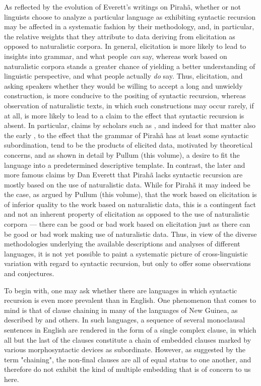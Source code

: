 \documentclass[output=paper,colorlinks,citecolor=brown
]{langscibook}
\begin{document}
As reflected by the evolution of Everett's writings on Pirahã, whether or not linguists choose to analyze a particular language as exhibiting syntactic recursion may be affected in a systematic fashion by their methodology, and, in particular, the relative weights that they attribute to data deriving from elicitation as opposed to naturalistic corpora.  In general, elicitation is more likely to lead to insights into grammar, and what people \emph{can} say, whereas work based on naturalistic corpora stands a greater chance of yielding a better understanding of linguistic perspective, and what people actually \emph{do} say.  Thus, elicitation, and asking speakers whether they would be willing to accept a long and unwieldy construction, is more conducive to the positing of syntactic recursion, whereas observation of naturalistic texts, in which such constructions may occur rarely, if at all, is more likely to lead to a claim to the effect that syntactic recursion is absent.  In particular, claims by scholars such as \citet{sandalo2018selfembedded}, and indeed for that matter also the early \citet{everett1986piraha}, to the effect that the grammar of Pirahã has at least some syntactic subordination, tend to be the products of elicited data, motivated by theoretical concerns, and as shown in detail by Pullum (this volume), a desire to fit the language into a predetermined descriptive template.  In contrast, the later and more famous claims by Dan Everett that Pirahã lacks syntactic recursion are mostly based on the use of naturalistic data.  While for Pirahã it may indeed be the case, as argued by Pullum (this volume), that the work based on elicitation is of inferior quality to the work based on naturalistic data, this is a contingent fact and not an inherent property of elicitation as opposed to the use of naturalistic corpora — there can be good or bad work based on elicitation just as there can be good or bad work making use of naturalistic data.  Thus, in view of the diverse methodologies underlying the available descriptions and analyses of different languages, it is not yet possible to paint a systematic picture of cross-linguistic variation with regard to syntactic recursion, but only to offer some observations and conjectures.

To begin with, one may ask whether there are languages in which syntactic recursion is even more prevalent than in English.  One phenomenon that comes to mind is that of clause chaining in many of the languages of New Guinea, as described by \citet{foley2010clause} and others.  In such languages, a sequence of several monoclausal sentences in English are rendered in the form of a single complex clause, in which all but the last of the clauses constitute a chain of embedded clauses marked by various morphosyntactic devices as subordinate.  However, as suggested by the term "chaining", the non-final clauses are all of equal status to one another, and therefore do not exhibit the kind of multiple embedding that is of concern to us here.
\end{document}
